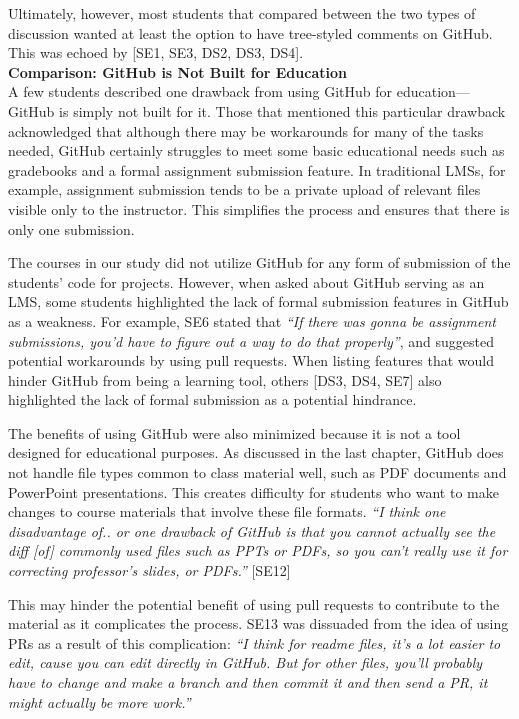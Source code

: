 Ultimately, however, most students that compared between the two types of discussion wanted at least the option to have tree-styled comments on GitHub. This was echoed by [SE1, SE3, DS2, DS3, DS4]. \\

\textbf{Comparison: GitHub is Not Built for Education} \\
A few students described one drawback from using GitHub for education---GitHub is simply not built for it. Those that mentioned this particular drawback acknowledged that although there may be workarounds for many of the tasks needed, GitHub certainly struggles to meet some basic educational needs such as gradebooks and a formal assignment submission feature. In traditional LMSs, for example, assignment submission tends to be a private upload of relevant files visible only to the instructor. This simplifies the process and ensures that there is only one submission.

The courses in our study did not utilize GitHub for any form of submission of the students' code for projects. However, when asked about GitHub serving as an LMS, some students highlighted the lack of formal submission features in GitHub as a weakness. For example, SE6 stated that \textit{``If there was gonna be assignment submissions, you'd have to figure out a way to do that properly''}, and suggested potential workarounds by using pull requests. When listing features that would hinder GitHub from being a learning tool, others [DS3, DS4, SE7] also highlighted the lack of formal submission as a potential hindrance.

The benefits of using GitHub were also minimized because it is not a tool designed for educational purposes. As discussed in the last chapter, GitHub does not handle file types common to class material well, such as PDF documents and PowerPoint presentations. This creates difficulty for students who want to make changes to course materials that involve these file formats. \textit{``I think one disadvantage of.. or one drawback of GitHub is that you cannot actually see the diff [of] commonly used files such as PPTs or PDFs, so you can't really use it for correcting professor's slides, or PDFs.''} [SE12]

This may hinder the potential benefit of using pull requests to contribute to the material as it complicates the process. SE13 was dissuaded from the idea of using PRs as a result of this complication: \textit{``I think for readme files, it's a lot easier to edit, cause you can edit directly in GitHub. But for other files, you'll probably have to change and make a branch and then commit it and then send a PR, it might actually be more work.''}

